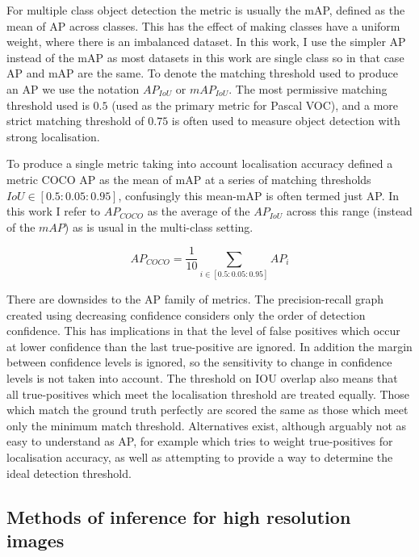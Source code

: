 For multiple class object detection the metric is usually the \gls{mAP}, defined as the mean of \gls{AP} across classes. This has the effect of making classes have a uniform weight, where there is an imbalanced dataset.  In this work, I use the simpler \gls{AP} instead of the \gls{mAP} as most  datasets in this work are single class so in that case \gls{AP} and \gls{mAP} are the same. To denote the matching threshold used to produce an \gls{AP} we use the notation $AP_{IoU}$ or $mAP_{IoU}$. The most permissive matching threshold used is $0.5$ (used as the primary metric for Pascal VOC), and a more strict matching threshold of $0.75$ is often used to measure object detection with strong localisation.

To produce a single metric taking into account localisation accuracy \cite{Lin2014} defined a metric COCO \gls{AP} as the mean of \gls{mAP} at a series of matching thresholds $ IoU \in [0.5 : 0.05 : 0.95] $, confusingly this mean-\gls{mAP} is often termed just \gls{AP}. In this work I refer to $AP_{COCO}$ as the average of the $AP_{IoU}$ across this range (instead of the $mAP$) as is usual in the multi-class setting.

\begin{equation}
AP_{COCO} = \frac{1}{10}\sum_{i \in [0.5 : 0.05 : 0.95]}AP_{i}
\label{eq:ap_coco}
\end{equation}

There are downsides to the \gls{AP} family of metrics. The precision-recall graph created using decreasing confidence considers only the order of detection confidence. This has implications in that the level of false positives which occur at lower confidence than the last true-positive are ignored. In addition the margin between confidence levels is ignored, so the sensitivity to change in confidence levels is not taken into account. The threshold on \gls{IOU} overlap also means that all true-positives which meet the localisation threshold are treated equally. Those which match the ground truth perfectly are scored the same as those which meet only the minimum match threshold. Alternatives exist, although arguably not as easy to understand as \gls{AP}, for example \cite{Oksuz2018} which tries to weight true-positives for localisation accuracy, as well as attempting to provide a way to determine the ideal detection threshold.


\subsection{Methods of inference for high resolution images}
\label{sec:highres_inference}


